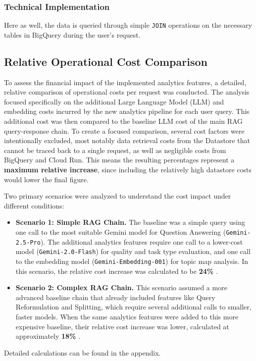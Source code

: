 \documentclass[
	english,
	ruledheaders=section,%
	class=report,%
	thesis={type=bachelor},%
	accentcolor=1b,%
	custommargins=true,%
	marginpar=false,%
	parskip=half-,%
	fontsize=11pt,%
	DIV=14,
]{tudapub}
\begin{document}
\subsubsection{Technical Implementation}
Here as well, the data is queried through simple \texttt{JOIN} operations on the necessary tables in BigQuery during the user's request.

\subsection{Relative Operational Cost Comparison}
To assess the financial impact of the implemented analytics features, a detailed, relative comparison of operational costs per request was conducted. The analysis focused specifically on the additional Large Language Model (LLM) and embedding costs incurred by the new analytics pipeline for each user query. This additional cost was then compared to the baseline LLM cost of the main RAG query-response chain. To create a focused comparison, several cost factors were intentionally excluded, most notably data retrieval costs from the Datastore that cannot be traced back to a single request, as well as negligible costs from BigQuery and Cloud Run. This means the resulting percentages represent a \textbf{maximum relative increase}, since including the relatively high datastore costs would lower the final figure.

Two primary scenarios were analyzed to understand the cost impact under different conditions:

\begin{itemize}
    \item \textbf{Scenario 1: Simple RAG Chain.} The baseline was a simple query using one call to the most suitable Gemini model for Question Answering (\texttt{Gemini-2.5-Pro}). The additional analytics features require one call to a lower-cost model (\texttt{Gemini-2.0-Flash}) for quality and task type evaluation, and one call to the embedding model (\texttt{Gemini-Embedding-001}) for topic map analysis. In this scenario, the relative cost increase was calculated to be \textbf{24\%} \parencite{GoogleGeminiPricing}.

    \item \textbf{Scenario 2: Complex RAG Chain.} This scenario assumed a more advanced baseline chain that already included features like Query Reformulation and Splitting, which require several additional calls to smaller, faster models. When the same analytics features were added to this more expensive baseline, their relative cost increase was lower, calculated at approximately \textbf{18\%} \parencite{GoogleGeminiPricing}.
\end{itemize}
Detailed calculations can be found in the appendix.
\end{document}
